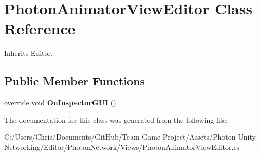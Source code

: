 \hypertarget{class_photon_animator_view_editor}{}\section{Photon\+Animator\+View\+Editor Class Reference}
\label{class_photon_animator_view_editor}


Inherits Editor.

\subsection*{Public Member Functions}
\begin{DoxyCompactItemize}
\item 
override void {\bfseries On\+Inspector\+G\+UI} ()\hypertarget{class_photon_animator_view_editor_a6d3340b275891161ebbb3f2ac06bda3c}{}\label{class_photon_animator_view_editor_a6d3340b275891161ebbb3f2ac06bda3c}

\end{DoxyCompactItemize}


The documentation for this class was generated from the following file\+:\begin{DoxyCompactItemize}
\item 
C\+:/\+Users/\+Chris/\+Documents/\+Git\+Hub/\+Team-\/\+Game-\/\+Project/\+Assets/\+Photon Unity Networking/\+Editor/\+Photon\+Network/\+Views/Photon\+Animator\+View\+Editor.\+cs\end{DoxyCompactItemize}
